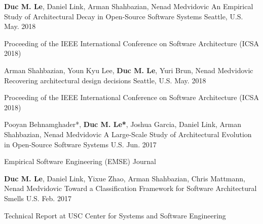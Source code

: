 \vspace{-1mm}

\begin{cventries}


\cventry
{\textbf{Duc M. Le}, Daniel	Link, Arman	Shahbazian, Nenad Medvidovic} %
{An Empirical Study of Architectural Decay in Open-Source Software Systems} %
{Seattle, U.S.} %
{May. 2018} %
{
	\begin{cvitems} %
		\item Proceeding of the IEEE International Conference on Software Architecture (ICSA 2018)
	\end{cvitems}
}

\cventry
{Arman	Shahbazian, Youn Kyu Lee, \textbf{Duc M. Le}, Yuri Brun, Nenad Medvidovic} %
{Recovering architectural design decisions} %
{Seattle, U.S.} %
{May. 2018} %
{
	\begin{cvitems} %
		\item Proceeding of the IEEE International Conference on Software Architecture (ICSA 2018)
	\end{cvitems}
}

  \cventry
    {Pooyan Behnamghader*, \textbf{Duc M. Le*}, Joshua Garcia, Daniel	Link, Arman	Shahbazian, Nenad Medvidovic} %
    {A Large-Scale Study of Architectural Evolution in Open-Source Software Systems} %
    {U.S. } %
    {Jun. 2017} %
    {
      \begin{cvitems} %
        \item Empirical Software Engineering (EMSE) Journal 
      \end{cvitems}
    }

\cventry
{\textbf{Duc M. Le}, Daniel	Link, Yixue Zhao, Arman	Shahbazian, Chris Mattmann, Nenad Medvidovic} %
{Toward a Classification Framework for Software Architectural Smells} %
{U.S. } %
{Feb. 2017} %
{
	\begin{cvitems} %
		\item Technical Report at USC Center for Systems and Software Engineering 
	\end{cvitems}
}
    


\end{cventries}
